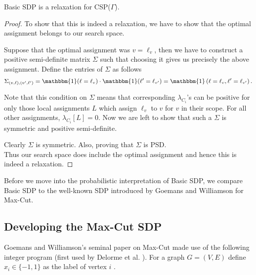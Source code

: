\begin{theorem}\label{sdprelaxproof}
Basic SDP is a relaxation for CSP($\Gamma$).
\end{theorem}
\begin{proof}
To show that this is indeed a relaxation, we have to show that the optimal assignment belongs to our search space. 

Suppose that the optimal assignment was $v=\ell_v$, then we have to construct a positive semi-definite matrix $\Sigma$ such that choosing it gives us precisely the above assignment. 
Define the entries of $\Sigma$ as follows 
$$ \Sigma_{\lrb{v, \ell},\lrb{v', \ell'}} = \mathbbm{1}(\ell = \ell_v) \cdot \mathbbm{1}(\ell' = \ell_{v'}) = \mathbbm{1}\lrb{\ell = \ell_v, \ell'= \ell_{v'}}.$$ 

Note that this condition on $\Sigma$ means that corresponding $\lambda_{C_i}$'s can be positive for only those local assignments $L$ which assign $\ell_v$ to $v$ for $v$ in their scope. 
For all other assignments, $\lambda_{C_i}[L]=0$.
Now we are left to show that such a $\Sigma$ is symmetric and positive semi-definite.

Clearly $\Sigma$ is symmetric. 
Also, 
proving that $\Sigma$ is PSD. \\
Thus our search space does include the optimal assignment and hence this is indeed a relaxation.
\end{proof}

Before we move into the probabilistic interpretation of Basic SDP, we compare Basic SDP to the well-known SDP introduced by Goemans and Williamson for Max-Cut.

\subsection{Developing the Max-Cut SDP}\label{maxcut}
Goemans and Williamson's seminal paper on Max-Cut \cite{gwFirstMaxCutSDP} made use of the following integer program (first used by Delorme et al. \cite{delormecombinatorial}). For a graph $G = (V,E)$ define $x_i \in \{-1,1\}$ as the label of vertex $i$ .
 
